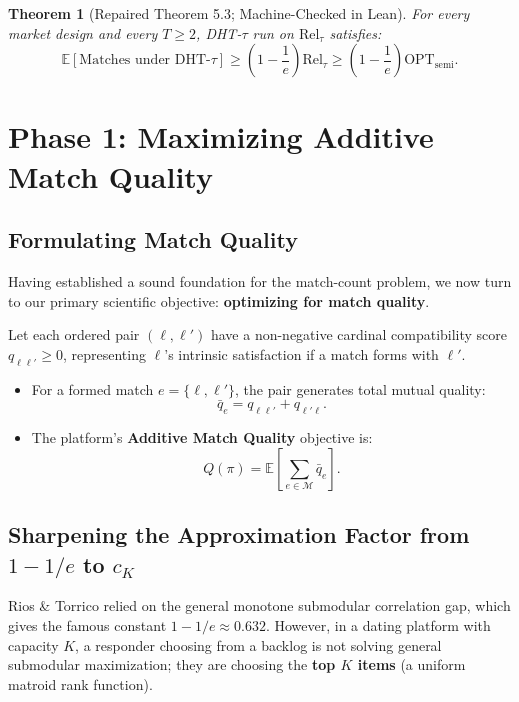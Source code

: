 \documentclass[11pt,letterpaper]{article}
\theoremstyle{definition}
\theoremstyle{plain}
\newtheorem{theorem}{Theorem}[section]
\theoremstyle{remark}
\begin{document}
\begin{theorem}[Repaired Theorem 5.3; Machine-Checked in Lean]
For every market design and every $T \ge 2$, DHT-$\tau$ run on $\mathrm{Rel}_\tau$ satisfies:
\begin{equation}
    \mathbb{E}[\text{Matches under DHT-}\tau] \ge \left(1 - \frac{1}{e}\right) \mathrm{Rel}_\tau \ge \left(1 - \frac{1}{e}\right) \mathrm{OPT}_{\text{semi}}.
\end{equation}
\end{theorem}

\newpage
\section{Phase 1: Maximizing Additive Match Quality}
\label{sec:additive_quality}

\subsection{Formulating Match Quality}
Having established a sound foundation for the match-count problem, we now turn to our primary scientific objective: \textbf{optimizing for match quality}.

Let each ordered pair $(\ell, \ell')$ have a non-negative cardinal compatibility score $q_{\ell\ell'} \ge 0$, representing $\ell$'s intrinsic satisfaction if a match forms with $\ell'$. 
\begin{itemize}[leftmargin=2em]
    \item For a formed match $e = \{\ell, \ell'\}$, the pair generates total mutual quality:
    \begin{equation}
        \bar{q}_e = q_{\ell\ell'} + q_{\ell'\ell}.
    \end{equation}
    \item The platform's \textbf{Additive Match Quality} objective is:
    \begin{equation}
        Q(\pi) = \mathbb{E} \left[ \sum_{e \in \mathcal{M}} \bar{q}_e \right].
    \end{equation}
\end{itemize}

\subsection{Sharpening the Approximation Factor from $1-1/e$ to $c_K$}
Rios \& Torrico relied on the general monotone submodular correlation gap, which gives the famous constant $1 - 1/e \approx 0.632$. However, in a dating platform with capacity $K$, a responder choosing from a backlog is not solving general submodular maximization; they are choosing the \textbf{top $K$ items} (a uniform matroid rank function).
\end{document}
